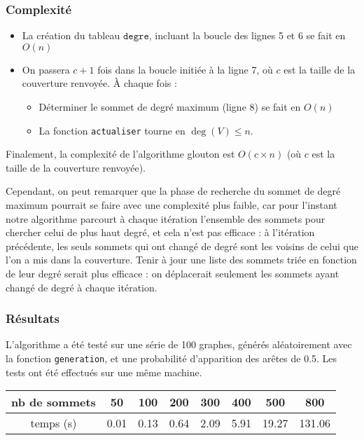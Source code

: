 \documentclass[a4paper,10pt]{article}
\newcommand*{\itemb}{\item[$\bullet$]}
\newcommand*{\itemt}{\item[$\blacktriangleright$]}
\begin{document}
\subsubsection{Complexité}

\begin{itemize}
 \itemb La création du tableau $\mathtt{degre}$, incluant la boucle des lignes 5 et 6 se fait en $O(n)$
 \itemb On passera $c+1$ fois dans la boucle initiée à la ligne 7, où $c$ est la taille de la couverture renvoyée. À chaque fois :
\begin{itemize}
\itemt Déterminer le sommet de degré maximum (ligne 8) se fait en $O(n)$
\itemt La fonction \texttt{actualiser} tourne en $\deg(V)\leqslant n$.
\end{itemize}
\end{itemize}

Finalement, la complexité de l'algorithme glouton est $O(c\times n)$ (où $c$ est la taille de la couverture renvoyée).

Cependant, on peut remarquer que la phase de recherche du sommet de degré maximum pourrait se faire avec une complexité plus faible, car pour l'instant notre algorithme parcourt à chaque itération l'ensemble des sommets pour chercher celui de plus haut degré, et cela n'est pas efficace : à l'itération précédente, les seuls sommets qui ont changé de degré sont les voisins de celui que l'on a mis dans la couverture. Tenir à jour une liste des sommets triée en fonction de leur degré serait plus efficace : on déplacerait seulement les sommets ayant changé de degré à chaque itération.

\subsubsection{Résultats}

L'algorithme a été testé sur une série de 100 graphes, générés aléatoirement avec la fonction \texttt{generation}, et une probabilité d'apparition des arêtes de 0.5. 
Les tests ont été effectués sur une même machine.

\bigskip
\begin{tabular}{|c|c|c|c|c|c|c|c|}
	\hline 
	nb de sommets & 50 & 100 & 200 & 300 & 400 & 500 & 800  \\
	\hline
	temps (s) & 0.01 & 0.13 & 0.64 & 2.09 & 5.91 & 19.27 & 131.06 \\
	\hline
\end{tabular}

\bigskip
\end{document}
